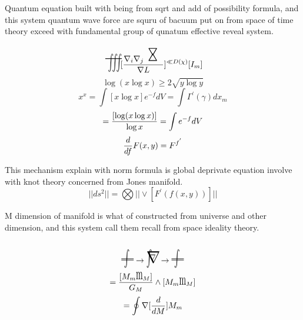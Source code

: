 \documentclass{jsarticle}
\begin{document}
  \newcommand{\intwhitewithnabla}{%
	  \begin{picture}(15,30)
		  \put(0,0){\scalebox{1}[2]{$\int$}}
		  \put(0,0){\scalebox{2.0}[2]{$\nabla$}}
		  \put(3,3){$\nabla$}
	  \end{picture}%
  } 


      Quantum equation built with being from sqrt and add of possibility
  formula, and this system quantum wave force are squru of bacuum
  put on from space of time theory exceed with fundamental group 
  of qunatum effective reveal system.
  $$ \scalebox{1}[2]{\variiint} 
  [{{\nabla_{i}\nabla_{j} \scalebox{2}[2]{\timebow}} \over {\nabla L}}]^{
	  \ll D(\chi)} [I_m] $$
  $$ \log(x\log x) \ge 2{\sqrt{y\log y}} $$
  $$ x^x = \int [x\log x]e^{-f}dV = \int {\Gamma^{'}(\gamma)}dx_m $$
  $$ = {{[\log(x\log x)]\over {\log x}}} = \int e^{-f}dV $$
  $$ {d \over {d f}}F(x,y) = F^{f^{'}} $$


     This mechanism explain with norm formula is global deprivate equation
  involve with knot theory concerned from Jones manifold.
  $$ ||ds^2|| = \bigotimes||\vee [F^{'}(f(x,y))]|| $$



     M dimension of manifold is what of constructed from universe and other
  dimension, and this system call them recall from space ideality theory.
  $$\iiivar \to  \intwhitewithnabla \to \iiivar $$
  $$ = {{[M_m \scalebox{1}[2]{\text{m}}_M]} \over {G_M}} \wedge{[M_m
  \scalebox{1}[2]{\text{m}}_M]} $$
  $$ = \oint \nabla[{d \over {d M}}]M_m $$
\end{document}
